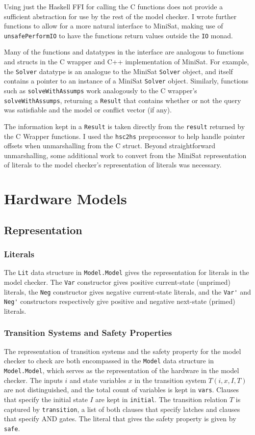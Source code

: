 \documentclass[12pt,a4paper,twoside,openright]{report}
\begin{document}
{Using just the Haskell FFI for calling the C functions does not provide a
sufficient abstraction for use by the rest of the model checker.
I wrote further functions to allow for a more natural interface to MiniSat,
 making use of \verb,unsafePerformIO, to have the functions return
values outside the \verb,IO, monad.

Many of the functions and datatypes in the interface are analogous to functions and structs in
the C wrapper and C++ implementation of MiniSat. For example, the \verb,Solver, datatype is an
analogue to the MiniSat \verb,Solver, object, and itself contains a pointer to an instance of
a MiniSat \verb,Solver, object. Similarly, functions such as \verb,solveWithAssumps, work
analogously to the C wrapper's \verb,solveWithAssumps,, returning a \verb,Result, that contains
whether or not the query was satisfiable and the model or conflict vector (if any).

The information kept in a \verb,Result, is taken directly from the \verb,result, returned by
the C Wrapper functions. I used the \verb,hsc2hs, preprocessor to help handle pointer offsets
when unmarshalling from the C struct. Beyond straightforward unmarshalling, some additional work
to convert from the MiniSat representation of literals to the model checker’s representation of
literals was necessary.

\section{Hardware Models}
\subsection{Representation}
\subsubsection{Literals}
The \verb,Lit, data structure in \verb,Model.Model, gives the representation for literals in
the model checker.
The \verb,Var, constructor gives positive current-state (unprimed) literals, the \verb,Neg,
constructor gives negative current-state literals, and the \verb,Var', and \verb,Neg', constructors
respectively give positive and negative next-state (primed) literals.

\subsubsection{Transition Systems and Safety Properties}
The representation of transition systems and the safety property for the model checker to check
are both encompassed in the \verb,Model, data structure in \verb,Model.Model,, which serves
as the representation of the hardware in the model checker.
The inputs $i$ and state variables $x$ in the transition system $T(i,x,I,T)$
are not distinguished, and the total count of variables is kept in \verb,vars,.
Clauses that specify the initial state $I$ are kept in \verb,initial,.
The transition relation $T$ is captured by \verb,transition,, a list of both clauses that specify
latches and clauses that specify AND gates.
The literal that gives the safety property is given by \verb,safe,.

}
\end{document}
